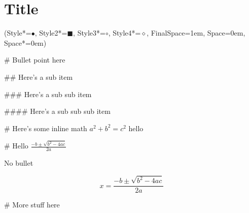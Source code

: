 \documentclass[11pt, oneside]{article}
\newcommand*{\begineasylist}{\begin{easylist}[itemize]\ListProperties(Style*=$\bullet$\quad, Style2*=\tiny$\blacksquare$\quad, Style3*=$\circ$\quad, Style4*=$\diamond$\quad, FinalSpace=1em, Space=0em, Space*=0em)}
\begin{document}
\section*{Title}

\begineasylist

# Bullet point here

## Here's a sub item

### Here's a sub sub item

#### Here's a sub sub sub item

# Here's some inline math $a^2 + b^2 = c^2$ hello

# Hello {\LARGE $\frac{-b \pm \sqrt{b^{2} - 4ac}}{2a}$}

No bullet

\[
    x = \frac{-b \pm \sqrt{b^{2} - 4ac}}{2a}
\]

# More stuff here



\end{easylist}
\end{document}
